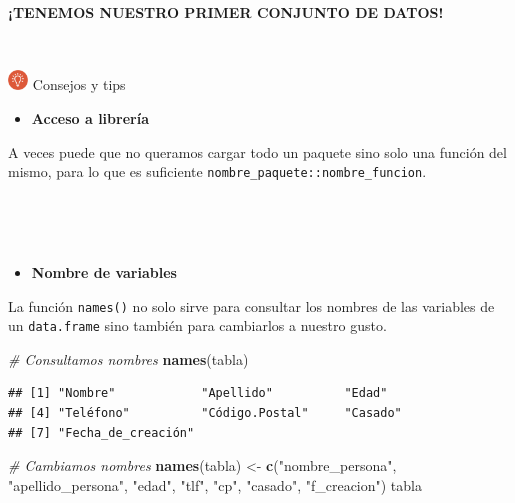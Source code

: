 \documentclass[11pt,]{book}
\newenvironment{Shaded}{\begin{snugshade}}{\end{snugshade}}
\newcommand{\CommentTok}[1]{\textcolor[rgb]{0.37,0.37,0.37}{\textit{#1}}}
\newcommand{\KeywordTok}[1]{\textcolor[rgb]{0.27,0.27,0.27}{\textbf{#1}}}
\newcommand{\NormalTok}[1]{#1}
\newcommand{\StringTok}[1]{\textcolor[rgb]{0.5,0.5,0.5}{#1}}
\providecommand{\tightlist}{%
  \setlength{\itemsep}{0pt}\setlength{\parskip}{0pt}}
\begin{document}
\textbf{¡TENEMOS NUESTRO PRIMER CONJUNTO DE DATOS!}

~

\includegraphics[width=0.04\textwidth,height=\textheight]{img/logo_info.png} Consejos y tips

\begin{itemize}
\tightlist
\item
  \textbf{Acceso a librería}
\end{itemize}

A veces puede que no queramos cargar todo un paquete sino solo una función del mismo, para lo que es suficiente \texttt{nombre\_paquete::nombre\_funcion}.

~

~

\begin{itemize}
\tightlist
\item
  \textbf{Nombre de variables}
\end{itemize}

La función \texttt{names()} no solo sirve para consultar los nombres de las variables de un \texttt{data.frame} sino también para cambiarlos a nuestro gusto.

\begin{Shaded}
\begin{Highlighting}[]
\CommentTok{# Consultamos nombres}
\KeywordTok{names}\NormalTok{(tabla)}
\end{Highlighting}
\end{Shaded}

\begin{verbatim}
## [1] "Nombre"            "Apellido"          "Edad"             
## [4] "Teléfono"          "Código.Postal"     "Casado"           
## [7] "Fecha_de_creación"
\end{verbatim}

\begin{Shaded}
\begin{Highlighting}[]
\CommentTok{# Cambiamos nombres}
\KeywordTok{names}\NormalTok{(tabla) <-}\StringTok{ }\KeywordTok{c}\NormalTok{(}\StringTok{"nombre_persona"}\NormalTok{, }\StringTok{"apellido_persona"}\NormalTok{, }\StringTok{"edad"}\NormalTok{, }\StringTok{"tlf"}\NormalTok{,}
                  \StringTok{"cp"}\NormalTok{, }\StringTok{"casado"}\NormalTok{, }\StringTok{"f_creacion"}\NormalTok{)}
\NormalTok{tabla}
\end{Highlighting}
\end{Shaded}
\end{document}
